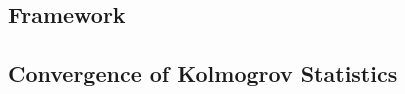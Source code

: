\documentclass[final_project_1.tex]{subfiles}
\begin{document}
\subsection{Framework}
\subsection{Convergence of Kolmogrov Statistics}
\end{document}
